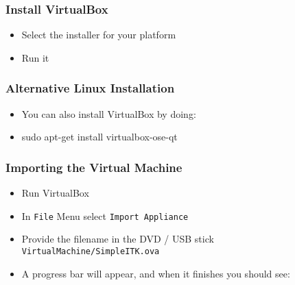 \begin{frame}
\frametitle{Install VirtualBox}
\begin{itemize}
\item Select the installer for your platform
\item Run it
\end{itemize}
\end{frame}

\begin{frame}
\frametitle{Alternative Linux Installation}
\begin{itemize}
\item  You can also install VirtualBox by doing:
\item  sudo apt-get install virtualbox-ose-qt
\end{itemize}
\end{frame}

\begin{frame}
\frametitle{Importing the Virtual Machine}
\begin{itemize}
\item Run VirtualBox
\item In \texttt{File} Menu select \texttt{Import Appliance}
\item Provide the filename in the DVD / USB stick \texttt{VirtualMachine/SimpleITK.ova}
\item A progress bar will appear, and when it finishes you should see:
\end{itemize}
\begin{center}
\end{center}
\end{frame}


